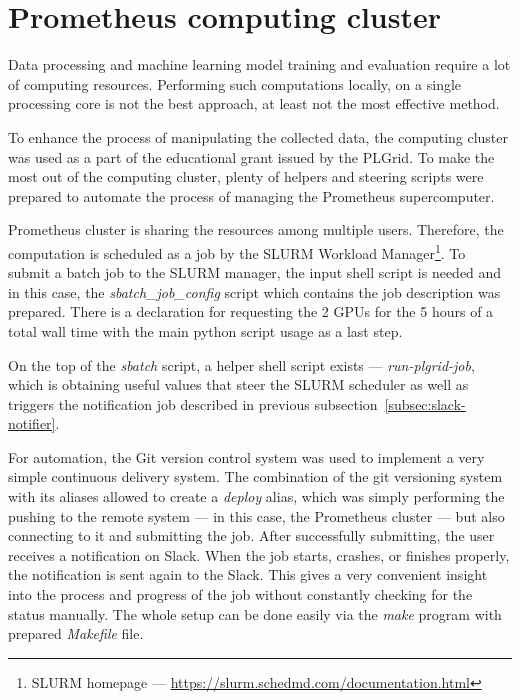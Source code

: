 \section{Prometheus computing cluster}\label{sec:prometheus-computing-cluster}
Data processing and machine learning model training and evaluation require a lot of computing resources.
Performing such computations locally, on a single processing core is not the best approach, at least not the most effective method.

To enhance the process of manipulating the collected data, the computing cluster was used as a part of the educational grant issued by the PLGrid.
To make the most out of the computing cluster, plenty of helpers and steering scripts were prepared to automate the process of managing the Prometheus supercomputer.

Prometheus cluster is sharing the resources among multiple users.
Therefore, the computation is scheduled as a job by the SLURM Workload Manager\footnote{SLURM homepage --- \url{https://slurm.schedmd.com/documentation.html}}.
To submit a batch job to the SLURM manager, the input shell script is needed and in this case, the \textit{sbatch\_job\_config} script which contains the job description was prepared.
There is a declaration for requesting the 2 GPUs for the 5 hours of a total wall time with the main python script usage as a last step.

On the top of the \textit{sbatch} script, a helper shell script exists --- \textit{run-plgrid-job}, which is obtaining useful values that steer the SLURM scheduler as well as triggers the notification job described in previous subsection~\ref{subsec:slack-notifier}.

For automation, the Git version control system was used to implement a very simple continuous delivery system.
The combination of the git versioning system with its aliases allowed to create a \textit{deploy} alias, which was simply performing the pushing to the remote system --- in this case, the Prometheus cluster --- but also connecting to it and submitting the job.
After successfully submitting, the user receives a notification on Slack.
When the job starts, crashes, or finishes properly, the notification is sent again to the Slack.
This gives a very convenient insight into the process and progress of the job without constantly checking for the status manually.
The whole setup can be done easily via the \textit{make} program with prepared \textit{Makefile} file.

